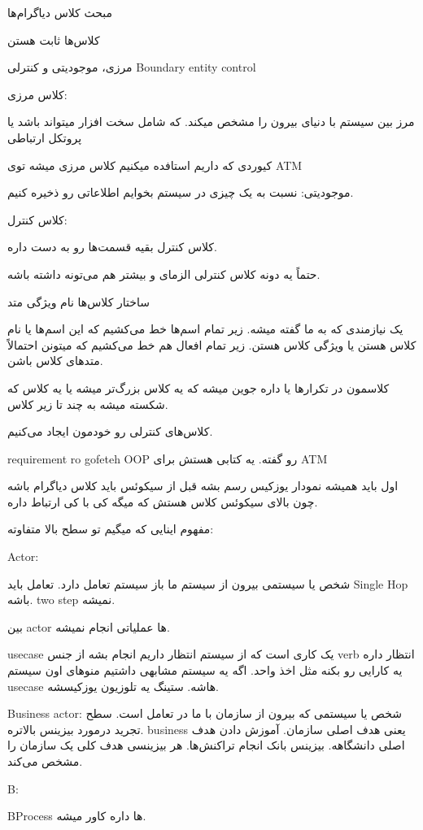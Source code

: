 مبحث کلاس دیاگرام‌ها

کلاس‌ها ثابت هستن

مرزی، موجودیتی و کنترلی
Boundary entity control

کلاس مرزی:

مرز بین سیستم با دنیای بیرون را مشخص میکند. که شامل سخت افزار میتواند باشد یا
پروتکل ارتباطی

کیوردی که داریم استافده میکنیم کلاس مرزی میشه توی ATM

موجودیتی:
نسبت به یک چیزی در سیستم بخوایم اطلاعاتی رو ذخیره کنیم.

کلاس کنترل:

کلاس کنترل بقیه قسمت‌ها رو به دست داره.

حتماً یه دونه کلاس کنترلی الزمای و بیشتر هم می‌تونه داشته باشه.

ساختار کلاس‌ها
نام ویژگی متد

یک نیازمندی که به ما گفته میشه. زیر تمام اسم‌ها خط می‌کشیم که این اسم‌ها یا نام
کلاس هستن یا ویژگی کلاس هستن. زیر تمام افعال هم خط می‌کشیم که میتونن احتمالاً
متد‌های کلاس باشن.

کلاسمون در تکرار‌ها یا داره جوین میشه که یه کلاس بزرگ‌تر میشه یا یه کلاس که
شکسته میشه به چند تا زیر کلاس.

کلاس‌های کنترلی رو خودمون ایجاد می‌کنیم.

requirement ro gofeteh
OOP رو گفته. یه کتابی هستش برای ATM

اول باید همیشه نمودار یوزکیس رسم بشه
قبل از سیکوئس باید کلاس دیاگرام باشه
چون بالای سیکوئس کلاس هستش که میگه کی با کی ارتباط داره.

مفهوم اینایی که میگیم تو سطح بالا متفاوته: 

Actor:

شخص یا سیستمی بیرون از سیستم ما باز سیستم تعامل دارد.
تعامل باید Single Hop باشه. two step نمیشه.

بین actor ها عملیاتی انجام نمیشه.

usecase یک کاری است که از سیستم انتظار داریم انجام بشه از جنس verb انتظار داره
یه کارایی رو بکنه مثل اخذ واحد. اگه یه سیستم مشابهی داشتیم منو‌های اون سیستم
usecase هاشه. ستینگ یه تلوزیون یوزکیسشه.

Business actor: شخص یا سیستمی که بیرون از سازمان با ما در تعامل است. سطح تجرید
درمورد بیزینس بالاتره.
business یعنی هدف اصلی سازمان. آموزش دادن هدف اصلی دانشگاهه. بیزینس بانک انجام
تراکنش‌ها. هر بیزینسی هدف کلی یک سازمان را مشخص می‌کند.

B:

BProcess ها داره کاور میشه.

